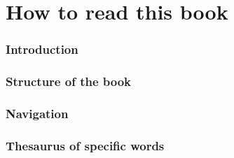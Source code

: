 \chapter{How to read this book}
	\subsection{Introduction}
	
	
	\subsection{Structure of the book}
		
		
	\subsection{Navigation}
	
	
	\subsection{Thesaurus of specific words}
\newpage	